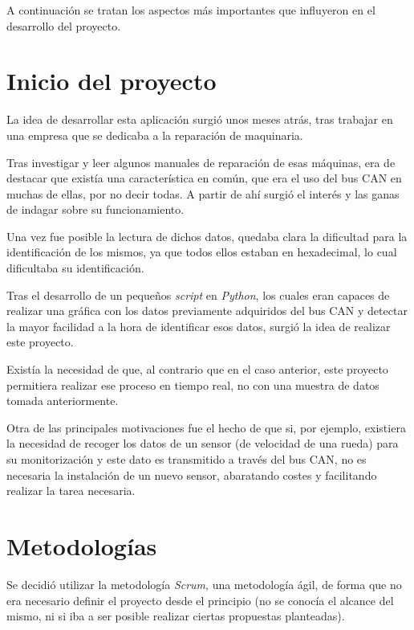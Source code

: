 
A continuación se tratan los aspectos más importantes que influyeron en el desarrollo del proyecto.

\section{Inicio del proyecto}\label{inicio_del_proyecto}

La idea de desarrollar esta aplicación surgió unos meses atrás, tras trabajar en una empresa que se dedicaba a la reparación de maquinaria.

Tras investigar y leer algunos manuales de reparación de esas máquinas, era de destacar que existía una característica en común, que era el uso del bus CAN en muchas de ellas, por no decir todas. A partir de ahí surgió el interés y las ganas de indagar sobre su funcionamiento.

Una vez fue posible la lectura de dichos datos, quedaba clara la dificultad para la identificación de los mismos, ya que todos ellos estaban en hexadecimal, lo cual dificultaba su identificación.

Tras el desarrollo de un pequeños \emph{script} en \emph{Python}, los cuales eran capaces de realizar una gráfica con los datos previamente adquiridos del bus CAN y detectar la mayor facilidad a la hora de identificar esos datos, surgió la idea de realizar este proyecto.

Existía la necesidad de que, al contrario que en el caso anterior, este proyecto permitiera realizar ese proceso en tiempo real, no con una muestra de datos tomada anteriormente.

Otra de las principales motivaciones fue el hecho de que si, por ejemplo, existiera la necesidad de recoger los datos de un sensor (de velocidad de una rueda) para su monitorización y este dato es transmitido a través del bus CAN, no es necesaria la instalación de un nuevo sensor, abaratando costes y facilitando realizar la tarea necesaria.

\section{Metodologías}\label{metodologias}

Se decidió utilizar la metodología \emph{Scrum}, una metodología ágil, de forma que no era necesario definir el proyecto desde el principio (no se conocía el alcance del mismo, ni si iba a ser posible realizar ciertas propuestas planteadas).


